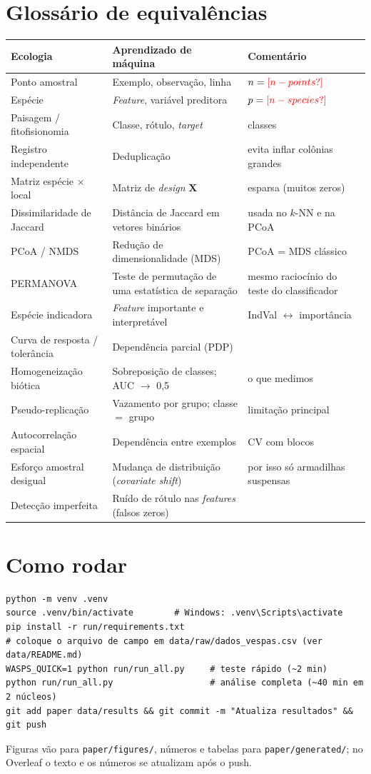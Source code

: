 \documentclass[11pt,a4paper]{article}
\makeatletter
\newcommand{\res}[1]{\ifcsname res@#1\endcsname\csname res@#1\endcsname\else\textcolor{red}{[#1?]}\fi}
\makeatother
\begin{document}
\section{Glossário de equivalências}
\begin{longtable}{>{\raggedright}p{4.2cm}>{\raggedright}p{4.2cm}>{\raggedright\arraybackslash}p{5.6cm}}
\toprule
Ecologia & Aprendizado de máquina & Comentário\\
\midrule\endhead
Ponto amostral & Exemplo, observação, linha & $n=\res{n-points}$\\
Espécie & \emph{Feature}, variável preditora & $p=\res{n-species}$\\
Paisagem / fitofisionomia & Classe, rótulo, \emph{target} & 3 classes\\
Registro independente & Deduplicação & evita inflar colônias grandes\\
Matriz espécie $\times$ local & Matriz de \emph{design} $\mathbf{X}$ & esparsa (muitos zeros)\\
Dissimilaridade de Jaccard & Distância de Jaccard em vetores binários & usada no $k$-NN e na PCoA\\
PCoA / NMDS & Redução de dimensionalidade (MDS) & PCoA = MDS clássico\\
PERMANOVA & Teste de permutação de uma estatística de separação & mesmo raciocínio do teste do classificador\\
Espécie indicadora & \emph{Feature} importante e interpretável & IndVal $\leftrightarrow$ importância\\
Curva de resposta / tolerância & Dependência parcial (PDP) & \\
Homogeneização biótica & Sobreposição de classes; AUC $\to$ 0,5 & o que medimos\\
Pseudo-replicação & Vazamento por grupo; classe $=$ grupo & limitação principal\\
Autocorrelação espacial & Dependência entre exemplos & CV com blocos\\
Esforço amostral desigual & Mudança de distribuição (\emph{covariate shift}) & por isso só armadilhas suspensas\\
Detecção imperfeita & Ruído de rótulo nas \emph{features} (falsos zeros) & \\
\bottomrule
\end{longtable}

\section{Como rodar}
\begin{verbatim}
python -m venv .venv
source .venv/bin/activate        # Windows: .venv\Scripts\activate
pip install -r run/requirements.txt
# coloque o arquivo de campo em data/raw/dados_vespas.csv (ver data/README.md)
WASPS_QUICK=1 python run/run_all.py     # teste rápido (~2 min)
python run/run_all.py                   # análise completa (~40 min em 2 núcleos)
git add paper data/results && git commit -m "Atualiza resultados" && git push
\end{verbatim}
Figuras vão para \texttt{paper/figures/}, números e tabelas para \texttt{paper/generated/}; no
Overleaf o texto e os números se atualizam após o push.
\end{document}

